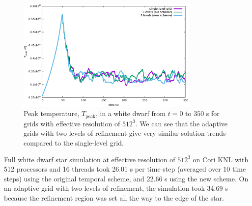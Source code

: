 \begin{figure}[htb]
\begin{center}
\includegraphics[width=3.5in]{./figs/wdconvect_amr_Tmax} 
\caption{\label{fig:wdconvect_amr_Tmax} Peak temperature, $T_{\text{peak}}$, in a white dwarf from $t=0$ to $350$ s 
         for grids with effective resolution of $512^3$. We can see that the adaptive grids with two levels of 
         refinement give very similar solution trends compared to the single-level grid.}
\end{center}
\end{figure}

Full white dwarf star simulation at effective resolution of $512^3$ on Cori KNL with 512 processors and 16 threads took 26.01 s per time step (averaged over 10 time steps) using the original temporal scheme, and 22.66 s using the new scheme. On an adaptive grid with two levels of refinement, the simulation took 34.69 s because the refinement region was set all the way to the edge of the star.  

